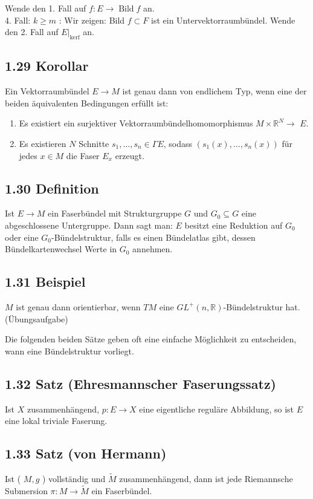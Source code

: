 Wende den 1. Fall auf $f: E \rightarrow \operatorname{Bild} f$ an.\\
4. Fall: $k \geq m$ : Wir zeigen: Bild $f \subset F$ ist ein Untervektorraumbündel. Wende den 2. Fall auf $\left.E\right|_{\operatorname{kerf}}$ an.

\subsection*{1.29 Korollar}
Ein Vektorraumbündel $E \rightarrow M$ ist genau dann von endlichem Typ, wenn eine der beiden äquivalenten Bedingungen erfüllt ist:

\begin{enumerate}
  \item Es existiert ein surjektiver Vektorraumbündelhomomorphismus $M \times \mathbb{R}^{N} \rightarrow$ $E$.
  \item Es existieren $N$ Schnitte $s_{1}, \ldots, s_{n} \in \Gamma E$, sodass $\left(s_{1}(x), \ldots, s_{n}(x)\right)$ für jedes $x \in M$ die Faser $E_{x}$ erzeugt.
\end{enumerate}

\subsection*{1.30 Definition}
Ist $E \rightarrow M$ ein Faserbündel mit Strukturgruppe $G$ und $G_{0} \subseteq G$ eine abgeschlossene Untergruppe. Dann sagt man: $E$ besitzt eine Reduktion auf $G_{0}$ oder eine $G_{0}$-Bündelstruktur, falls es einen Bündelatlas gibt, dessen Bündelkartenwechsel Werte in $G_{0}$ annehmen.

\subsection*{1.31 Beispiel}
$M$ ist genau dann orientierbar, wenn $T M$ eine $G L^{+}(n, \mathbb{R})$-Bündelstruktur hat. (Übungsaufgabe)

Die folgenden beiden Sätze geben oft eine einfache Möglichkeit zu entscheiden, wann eine Bündelstruktur vorliegt.

\subsection*{1.32 Satz (Ehresmannscher Faserungssatz)}
Ist $X$ zusammenhängend, $p: E \rightarrow X$ eine eigentliche reguläre Abbildung, so ist $E$ eine lokal triviale Faserung.

\subsection*{1.33 Satz (von Hermann)}
Ist ( $M, g$ ) vollständig und $\tilde{M}$ zusammenhängend, dann ist jede Riemannsche Submersion $\pi: M \rightarrow \tilde{M}$ ein Faserbündel.

